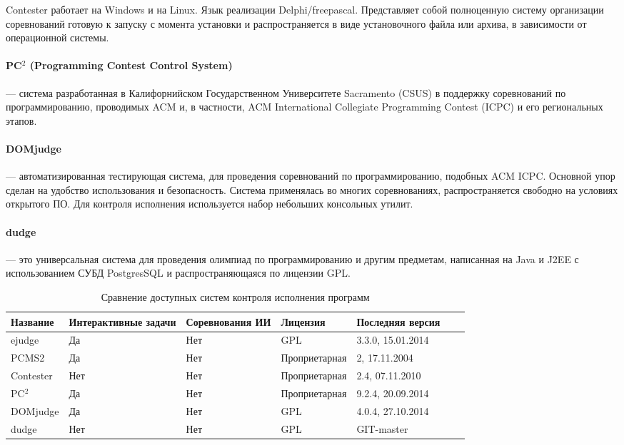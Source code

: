 \documentclass{imcs}
\begin{document}
Contester работает на Windows и на Linux. Язык реализации Delphi/freepascal. Представляет собой полноценную систему организации соревнований готовую к запуску с момента установки и распространяется в виде установочного файла или архива, в зависимости от операционной системы. \cite{contester}

\paragraph{PC$^2$ (Programming Contest Control System)} — система разработанная в Калифорнийском Государственном Университете Sacramento (CSUS) в поддержку соревнований по программированию, проводимых ACM и, в частности, ACM International Collegiate Programming Contest (ICPC) и его региональных этапов. \cite{pccs}

\paragraph{DOMjudge} — автоматизированная тестирующая система, для проведения соревнований по программированию, подобных ACM ICPC. Основной упор сделан на удобство использования и безопасность. Система применялась во многих соревнованиях, распространяется свободно на условиях открытого ПО.
Для контроля исполнения используется набор небольших консольных утилит. \cite{domjudge}

\paragraph{dudge} — это универсальная система для проведения олимпиад по программированию и другим предметам, написанная на Java и J2EE с использованием СУБД PostgresSQL и распространяющаяся по лицензии GPL. \cite{dudge}

\begin{landscape}
\begin{table}[h!]
\begin{center}
\begin{tabularx}{25cm}{|X|X|X|X|X|X|X|}
\hline
Название & Интерактивные задачи & Соревнования ИИ & Лицензия & Последняя версия \\ \hline
ejudge & Да & Нет & GPL & 3.3.0, 15.01.2014 \\ \hline
PCMS2 & Да & Нет & Проприетарная & 2, 17.11.2004 \\ \hline
Contester & Нет & Нет & Проприетарная & 2.4, 07.11.2010 \\ \hline
PC$^2$ & Да & Нет & Проприетарная & 9.2.4, 20.09.2014 \\ \hline
DOMjudge & Да & Нет & GPL & 4.0.4, 27.10.2014 \\ \hline
dudge & Нет & Нет & GPL & GIT-master \\ \hline
\end{tabularx}
\caption{Сравнение доступных систем контроля исполнения программ}\label{tab:wsi_diff_rel}
\end{center}
\end{table}
\end{landscape}
\end{document}
